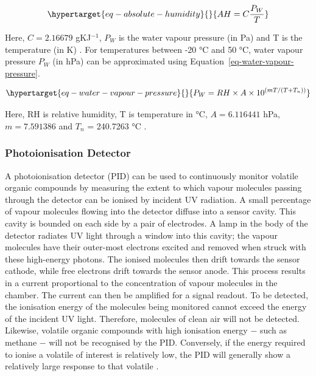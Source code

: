 \documentclass[
  a4paper,
]{scrbook}
\begin{document}
\begin{equation}\protect\hypertarget{eq-absolute-humidity}{}{ 
AH = C\frac{P_W}{T}
}\label{eq-absolute-humidity}\end{equation}

Here, \(C = 2.16679\) gKJ\(^{-1}\), \(P_W\) is the water vapour pressure
(in Pa) and T is the temperature (in K) \autocite{humidityformula}. For
temperatures between -20 °C and 50 °C, water vapour pressure \(P_W\) (in
hPa) can be approximated using Equation~\ref{eq-water-vapour-pressure}.

\begin{equation}\protect\hypertarget{eq-water-vapour-pressure}{}{
P_W = RH \times A \times 10^{(mT/(T+T_{n}))}
}\label{eq-water-vapour-pressure}\end{equation}

Here, RH is relative humidity, T is temperature in °C, \(A = 6.116441\)
hPa, \(m = 7.591386\) and \(T_{n}\) = 240.7263 °C
\autocite{humidityformula}.

\hypertarget{photoionisation-detector}{%
\subsubsection*{Photoionisation
Detector}\label{photoionisation-detector}}

A photoionisation detector (PID) can be used to continuously monitor
volatile organic compounds by measuring the extent to which vapour
molecules passing through the detector can be ionised by incident UV
radiation. A small percentage of vapour molecules flowing into the
detector diffuse into a sensor cavity. This cavity is bounded on each
side by a pair of electrodes. A lamp in the body of the detector
radiates UV light through a window into this cavity; the vapour
molecules have their outer-most electrons excited and removed when
struck with these high-energy photons. The ionised molecules then drift
towards the sensor cathode, while free electrons drift towards the
sensor anode. This process results in a current proportional to the
concentration of vapour molecules in the chamber. The current can then
be amplified for a signal readout. To be detected, the ionisation energy
of the molecules being monitored cannot exceed the energy of the
incident UV light. Therefore, molecules of clean air will not be
detected. Likewise, volatile organic compounds with high ionisation
energy \(-\) such as methane \(-\) will not be recognised by the PID.
Conversely, if the energy required to ionise a volatile of interest is
relatively low, the PID will generally show a relatively large response
to that volatile \autocite{Ionscience,PIDmanual}.
\end{document}
